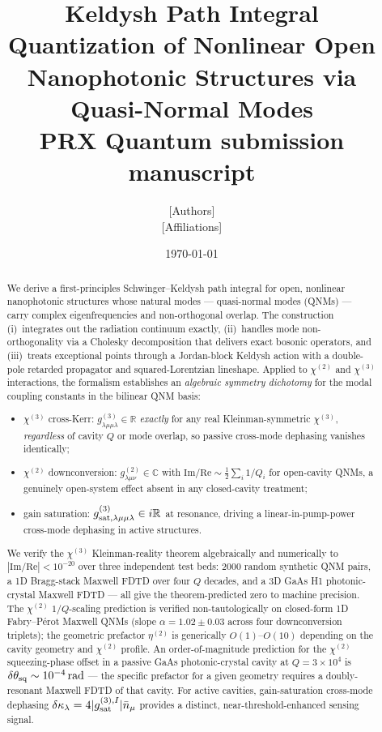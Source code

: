 \documentclass[11pt]{article}
\title{\textbf{Keldysh Path Integral Quantization of Nonlinear Open
Nanophotonic Structures via Quasi-Normal Modes}\\[0.3em]
\large PRX Quantum submission manuscript}
\author{[Authors]\\\small[Affiliations]}
\date{\today}
\begin{document}
\maketitle
\begin{abstract}
We derive a first-principles Schwinger--Keldysh path integral for open,
nonlinear nanophotonic structures whose natural modes --- quasi-normal
modes (QNMs) --- carry complex eigenfrequencies and non-orthogonal
overlap.  The construction (i)~integrates out the radiation continuum
exactly, (ii)~handles mode non-orthogonality via a Cholesky
decomposition that delivers exact bosonic operators, and
(iii)~treats exceptional points through a Jordan-block Keldysh action
with a double-pole retarded propagator and squared-Lorentzian lineshape.
Applied to $\chi^{(2)}$ and $\chi^{(3)}$ interactions, the formalism
establishes an \emph{algebraic symmetry dichotomy} for the modal
coupling constants in the bilinear QNM basis:
\begin{itemize}\itemsep0em
  \item $\chi^{(3)}$ cross-Kerr: $g^{(3)}_{\lambda\mu\mu\lambda}\in\mathbb{R}$
        \emph{exactly} for any real Kleinman-symmetric $\chi^{(3)}$,
        \emph{regardless} of cavity $Q$ or mode overlap, so passive
        cross-mode dephasing vanishes identically;
  \item $\chi^{(2)}$ downconversion: $g^{(2)}_{\lambda\mu\nu}\in\mathbb{C}$
        with $\mathrm{Im}/\mathrm{Re}\sim\tfrac{1}{2}\sum_i 1/Q_i$
        for open-cavity QNMs, a genuinely open-system effect absent
        in any closed-cavity treatment;
  \item gain saturation: $g^{(3)}_{\rm sat,\lambda\mu\mu\lambda}\in i\mathbb{R}$
        at resonance, driving a linear-in-pump-power cross-mode
        dephasing in active structures.
\end{itemize}
We verify the $\chi^{(3)}$ Kleinman-reality theorem algebraically and
numerically to $|\mathrm{Im}/\mathrm{Re}|<10^{-20}$ over three
independent test beds: 2000 random synthetic QNM pairs, a 1D Bragg-stack
Maxwell FDTD over four $Q$ decades, and a 3D GaAs H1 photonic-crystal
Maxwell FDTD --- all give the theorem-predicted zero to machine precision.
The $\chi^{(2)}$ $1/Q$-scaling prediction is verified non-tautologically
on closed-form 1D Fabry--P\'erot Maxwell QNMs (slope $\alpha=1.02\pm0.03$
across four downconversion triplets); the geometric prefactor
$\eta^{(2)}$ is generically $O(1)$--$O(10)$ depending on the cavity
geometry and $\chi^{(2)}$ profile.  An order-of-magnitude prediction
for the $\chi^{(2)}$ squeezing-phase offset in a passive GaAs
photonic-crystal cavity at $Q=3\times 10^4$ is
$\delta\theta_{\rm sq}\sim 10^{-4}\,\mathrm{rad}$ --- the specific
prefactor for a given geometry requires a doubly-resonant Maxwell FDTD
of that cavity.  For active cavities, gain-saturation
cross-mode dephasing $\delta\kappa_\lambda=4|g^{(3),I}_{\rm sat}|\bar{n}_\mu$
provides a distinct, near-threshold-enhanced sensing signal.
\end{abstract}
\end{document}
